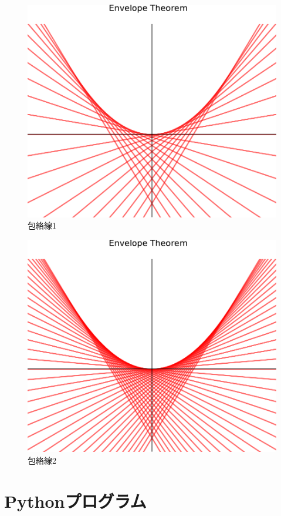 \documentclass[11pt,a4j,fleqn]{jarticle}
\begin{document}
\begin{figure}
 \centering
 \includegraphics{envelope0.pdf}
 \caption{包絡線1}
 \label{fig:1}
\end{figure}

\begin{figure}
 \centering
 \includegraphics{envelope1.pdf}
 \caption{包絡線2}
 \label{fig:2}
\end{figure}




\section{Pythonプログラム}
\end{document}
